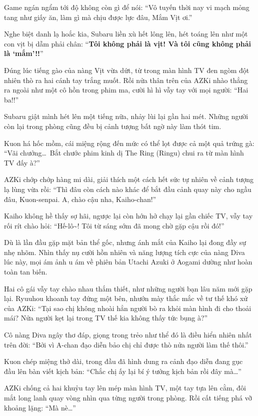 \documentclass[../main.tex]{subfiles}
\begin{document}
Game ngán ngẩm tới độ không còn gì để nói: ``Vô tuyến thời nay vi mạch mỏng tang như giấy ăn, làm gì mà chịu được lực đâu, Mắm Vịt ơi.''

Nghe biệt danh lạ hoắc kia, Subaru liền xù hết lông lên, hét toáng lên như một con vịt bị dẫm phải chân: ``\textbf{Tôi không phải là vịt! Và tôi cũng không phải là `mắm'!!}''

Đúng lúc tiếng gào của nàng Vịt vừa dứt, từ trong màn hình TV đen ngòm đột nhiên thò ra hai cánh tay trắng muốt. Rồi nửa thân trên của AZKi nhào thẳng ra ngoài như một cô hồn trong phim ma, cười hì hì vẫy tay với mọi người: ``Hai ba!!''


Subaru giật mình hét lên một tiếng nữa, nhảy lùi lại gần hai mét. Những người còn lại trong phòng cũng đều bị cảnh tượng bất ngờ này làm thót tim.

Kuon há hốc mồm, cái miệng rộng đến mức có thể lọt được cả một quả trứng gà: ``Vãi chưởng\dots\ Bắt chước phim kinh dị The Ring (Ringu) chui ra từ màn hình TV đấy à?''

AZKi chớp chớp hàng mi dài, giải thích một cách hết sức tự nhiên về cảnh tượng lạ lùng vừa rồi: ``Thì đâu còn cách nào khác để bắt đầu cảnh quay này cho ngầu đâu, Kuon-senpai. A, chào cậu nha, Kaiho-chan!''

Kaiho không hề thấy sợ hãi, ngược lại còn hớn hở chạy lại gần chiếc TV, vẫy tay rối rít chào hỏi: ``Hế-lô\~{}! Tôi từ sáng sớm đã mong chờ gặp cậu rồi đó!''

Dù là lần đầu gặp mặt bản thể gốc, nhưng ánh mắt của Kaiho lại đong đầy sự nhẹ nhõm. Nhìn thấy nụ cười hồn nhiên và năng lượng tích cực của nàng Diva lúc này, mọi ám ảnh u ám về phiên bản Utachi Azuki ở Aogami dường như hoàn toàn tan biến.

Hai cô gái vẫy tay chào nhau thắm thiết, như những người bạn lâu năm mới gặp lại. Ryuuhou khoanh tay đứng một bên, nhướn mày thắc mắc về tư thế khó xử của AZKi: ``Tại sao chị không nhoài hẳn người bò ra khỏi màn hình đi cho thoải mái? Nửa người kẹt lại trong TV thế kia không thấy tức bụng à?''

Cô nàng Diva ngây thơ đáp, giọng trong trẻo như thể đó là điều hiển nhiên nhất trên đời: ``Bởi vì A-chan đạo diễn bảo chị chỉ được thò nửa người làm thế thôi.''

Kuon chép miệng thở dài, trong đầu đã hình dung ra cảnh đạo diễn đang gục đầu lên bàn viết kịch bản: ``Chắc chị ấy lại bí ý tưởng kịch bản rồi đây mà\dots''

AZKi chống cả hai khuỷu tay lên mép màn hình TV, một tay tựa lên cằm, đôi mắt long lanh quay vòng nhìn qua từng người trong phòng. Rồi cất tiếng phá vỡ khoảng lặng: ``Mà nè\dots''
\end{document}
